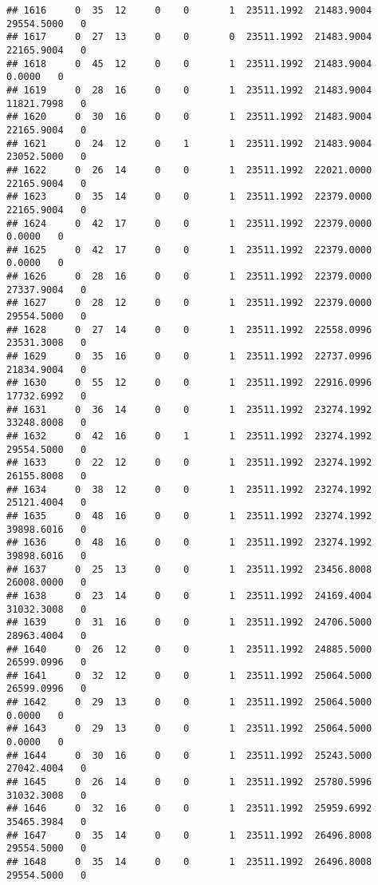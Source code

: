 \documentclass[
]{article}
\begin{document}
\begin{enumerate}
\begin{verbatim}
## 1616     0  35  12     0    0       1  23511.1992  21483.9004  29554.5000   0
## 1617     0  27  13     0    0       0  23511.1992  21483.9004  22165.9004   0
## 1618     0  45  12     0    0       1  23511.1992  21483.9004      0.0000   0
## 1619     0  28  16     0    0       1  23511.1992  21483.9004  11821.7998   0
## 1620     0  30  16     0    0       1  23511.1992  21483.9004  22165.9004   0
## 1621     0  24  12     0    1       1  23511.1992  21483.9004  23052.5000   0
## 1622     0  26  14     0    0       1  23511.1992  22021.0000  22165.9004   0
## 1623     0  35  14     0    0       1  23511.1992  22379.0000  22165.9004   0
## 1624     0  42  17     0    0       1  23511.1992  22379.0000      0.0000   0
## 1625     0  42  17     0    0       1  23511.1992  22379.0000      0.0000   0
## 1626     0  28  16     0    0       1  23511.1992  22379.0000  27337.9004   0
## 1627     0  28  12     0    0       1  23511.1992  22379.0000  29554.5000   0
## 1628     0  27  14     0    0       1  23511.1992  22558.0996  23531.3008   0
## 1629     0  35  16     0    0       1  23511.1992  22737.0996  21834.9004   0
## 1630     0  55  12     0    0       1  23511.1992  22916.0996  17732.6992   0
## 1631     0  36  14     0    0       1  23511.1992  23274.1992  33248.8008   0
## 1632     0  42  16     0    1       1  23511.1992  23274.1992  29554.5000   0
## 1633     0  22  12     0    0       1  23511.1992  23274.1992  26155.8008   0
## 1634     0  38  12     0    0       1  23511.1992  23274.1992  25121.4004   0
## 1635     0  48  16     0    0       1  23511.1992  23274.1992  39898.6016   0
## 1636     0  48  16     0    0       1  23511.1992  23274.1992  39898.6016   0
## 1637     0  25  13     0    0       1  23511.1992  23456.8008  26008.0000   0
## 1638     0  23  14     0    0       1  23511.1992  24169.4004  31032.3008   0
## 1639     0  31  16     0    0       1  23511.1992  24706.5000  28963.4004   0
## 1640     0  26  12     0    0       1  23511.1992  24885.5000  26599.0996   0
## 1641     0  32  12     0    0       1  23511.1992  25064.5000  26599.0996   0
## 1642     0  29  13     0    0       1  23511.1992  25064.5000      0.0000   0
## 1643     0  29  13     0    0       1  23511.1992  25064.5000      0.0000   0
## 1644     0  30  16     0    0       1  23511.1992  25243.5000  27042.4004   0
## 1645     0  26  14     0    0       1  23511.1992  25780.5996  31032.3008   0
## 1646     0  32  16     0    0       1  23511.1992  25959.6992  35465.3984   0
## 1647     0  35  14     0    0       1  23511.1992  26496.8008  29554.5000   0
## 1648     0  35  14     0    0       1  23511.1992  26496.8008  29554.5000   0

\end{verbatim}
\end{enumerate}
\end{document}
